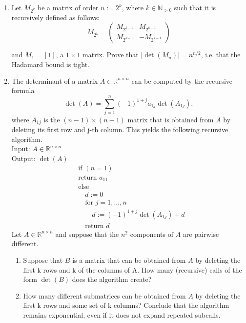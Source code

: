 \documentclass[11pt]{article}
\newcommand{\setR}{\mathbb{R}}
\newcommand{\setN}{\mathbb{N}}
\begin{document}
\begin{enumerate}[1)]
\item Let $M_{2^k}$ be a matrix of order $n:= 2^k$, where $k∈\setN_{>0}$ such that it is recursively defined as follows:
$$M_{2^k} = \begin{pmatrix} M_{2^{k−1}} &  M_{2^{k−1}} \\ M_{2^{k−1}} & −M_{2^{k−1}} \end{pmatrix} $$

and $M_1 = [1]$, a $1 \times 1$ matrix. Prove that $|\det(M_n)|= n^{n/2}$, i.e. that the Hadamard bound is tight.




\item The determinant of a matrix $A∈\setR^{n×n}$ can be computed by the recursive formula
$$\det(A) = \displaystyle\sum_{j=1}^n (-1)^{1+j} a_{1j}\det(A_{1j}), $$
where $A_{1j}$ is the $(n−1)\times(n−1)$ matrix that is obtained from $A$ by deleting its first row and j-th
column. This yields the following recursive algorithm.\\
Input: $A∈\setR^{n×n}$ \\
Output: $\det(A)$\\
\begin{align*}
& \text{if } (n= 1) \\
&\text{return }a_{11}\\
&\text{else} \\
& \quad d:= 0\\
& \quad\text{for }j = 1,...,n\\
& \quad \quad d:= (−1)^{1+j} \det(A_{1j} ) + d \\
&\quad \text{return }d
\end{align*}
Let $A∈\setR^{n×n}$ and suppose that the $n^2$ components of $A$ are pairwise diﬀerent.
\begin{enumerate}
\item Suppose that $B$ is a matrix that can be obtained from $A$ by deleting the first k rows and k of
the columns of A. How many (recursive) calls of the form $\det(B)$ does the algorithm create?
\item How many diﬀerent submatrices can be obtained from $A$ by deleting the first k rows and some
set of k columns? Conclude that the algorithm remains exponential, even if it does not expand
repeated subcalls.
\end{enumerate}


\end{enumerate}



  
\end{document}
